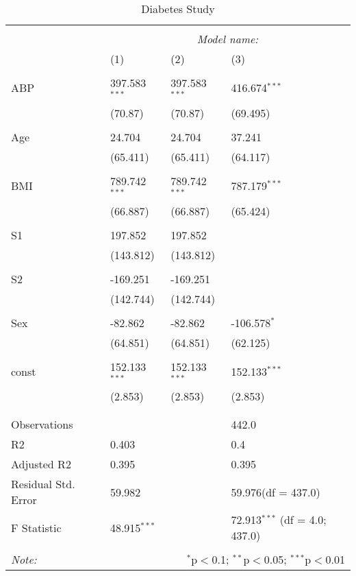\documentclass[12pt]{article}
\numberwithin{equation}{subsection}
\begin{document}
\begin{table}[!htbp] \centering
  \caption{Diabetes Study}
  \label{}
\begin{tabularx}{\textwidth}{lXXX}
\\[-1.8ex]\hline
\hline \\[-1.8ex]
& \multicolumn{3}{c}{\textit{Model name:}} \
\cr \cline{3-4}
\\[-1.8ex] & (1) & (2) & (3) \\
\hline \\[-1.8ex]
 ABP & 397.583$^{***}$ & 397.583$^{***}$ & 416.674$^{***}$ \\
  & (70.87) & (70.87) & (69.495) \\
  & & & \\
 Age & 24.704$^{}$ & 24.704$^{}$ & 37.241$^{}$ \\
  & (65.411) & (65.411) & (64.117) \\
  & & & \\
 BMI & 789.742$^{***}$ & 789.742$^{***}$ & 787.179$^{***}$ \\
  & (66.887) & (66.887) & (65.424) \\
  & & & \\
 S1 & 197.852$^{}$ & 197.852$^{}$ & \\
  & (143.812) & (143.812) & \\
  & & & \\
 S2 & -169.251$^{}$ & -169.251$^{}$ & \\
  & (142.744) & (142.744) & \\
  & & & \\
 Sex & -82.862$^{}$ & -82.862$^{}$ & -106.578$^{*}$ \\
  & (64.851) & (64.851) & (62.125) \\
  & & & \\
 const & 152.133$^{***}$ & 152.133$^{***}$ & 152.133$^{***}$ \\
  & (2.853) & (2.853) & (2.853) \\
  & & & \\
\hline \\[-1.8ex]
 Observations &   &   & 442.0 \\
 R${2}$ & 0.403 &   & 0.4 \\
 Adjusted R${2}$ & 0.395 &   & 0.395 \\
 Residual Std. Error & 59.982 &   & 59.976(df = 437.0)  \\
 F Statistic & 48.915$^{***}$  &     & 72.913$^{***}$ (df = 4.0; 437.0) \\
\hline
\hline \\[-1.8ex]
\textit{Note:} & \multicolumn{3}{r}{$^{*}$p$<$0.1; $^{**}$p$<$0.05; $^{***}$p$<$0.01} \\
\end{tabularx}
\end{table}
\end{document}
